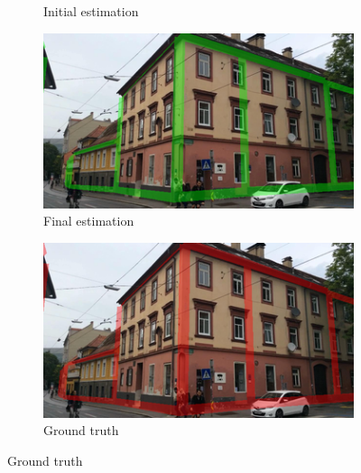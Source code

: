 \begin{figure}[htpb]
\begin{subfigure}{.18\textwidth}
\begin{center}
                        \caption{\label{subfig::init_pose} Initial estimation}
                    \end{center}
                \end{subfigure}
                \hfill
                \begin{subfigure}{.18\textwidth}
                    \begin{center}
                        \includegraphics[width=\textwidth]{images/3d_model_applications/pose_estimation/best_pose}
                        \caption{\label{subfig::final_pose} Final estimation}
                    \end{center}
                \end{subfigure}
                \hfill
                \begin{subfigure}{.18\textwidth}
                    \begin{center}
                        \includegraphics[width=\textwidth]{images/3d_model_applications/pose_estimation/ground_truth}
                        \caption{\label{subfig::gt_pose} Ground truth}
                    \end{center}

\end{subfigure}
\end{figure}
